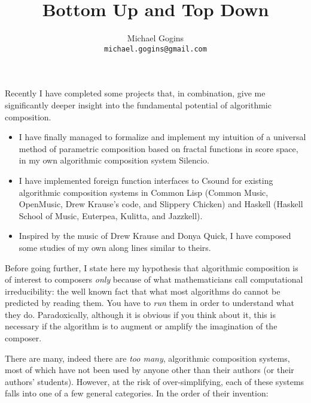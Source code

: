 \documentclass[english,11pt,letterpaper,onecolumn]{scrartcl}
\numberwithin{equation}{section}
\begin{document}
\title{Bottom Up and Top Down} \author{Michael
Gogins \\ \texttt{michael.gogins@gmail.com}} \maketitle

Recently I have completed some projects that, in combination, give me significantly deeper insight into the fundamental potential of algorithmic composition. 

\begin{itemize}
	\item I have finally managed to formalize and implement my intuition of a universal method of parametric composition based on fractal functions in score space, in my own algorithmic composition system Silencio. 
	
	\item I have implemented foreign function interfaces to Csound for existing algorithmic composition systems in Common Lisp (Common Music, OpenMusic, Drew Krause's code, and Slippery Chicken) and Haskell (Haskell School of Music, Euterpea, Kulitta, and Jazzkell). 
	
	\item Inspired by the music of Drew Krause and Donya Quick, I have composed some studies of my own along lines similar to theirs.
\end{itemize}

Before going further, I state here my hypothesis that algorithmic composition is of interest to composers \textit{only} because of what mathematicians call computational irreducibility: the well known fact that what most algorithms do cannot be predicted by reading them. You have to \textit{run} them in order to understand what they do. Paradoxically, although it is obvious if you think about it, this is necessary if the algorithm is to augment or amplify the imagination of the composer.

There are many, indeed there are \textit{too many}, algorithmic composition systems, most of which have not been used by anyone other than their authors (or their authors' students). However, at the risk of over-simplifying, each of these systems falls into one of a few general categories. In the order of their invention:
\end{document}
